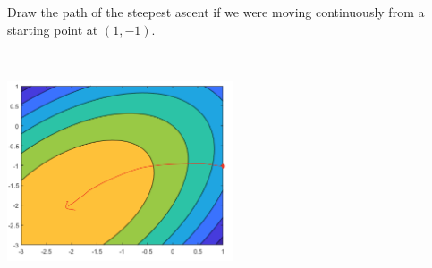 Draw the path of the steepest ascent if we were moving continuously from a starting point at $(1, -1)$.

\begin{solution} \
\begin{center}
    \includegraphics[width=0.5\textwidth]{img/e7p2.png}
\end{center}
\end{solution}